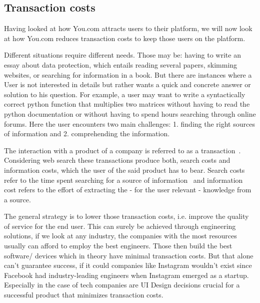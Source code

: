 \documentclass[5p,twocolumn,final]{elsarticle}
\begin{document}
\subsection{Transaction costs}
Having looked at how You.com attracts users to their platform, we will now look at how You.com reduces transaction costs to keep those users on the platform.\par
Different situations require different needs. Those may be: having to write an essay about data protection, which entails reading several papers, skimming websites, or searching for information in a book. But there are instances where a User is not interested in details but rather wants a quick and concrete answer or solution to his question. For example, a user may want to write a syntactically correct python function that multiplies two matrices without having to read the python documentation or without having to spend hours searching through online forums. Here the user encounters two main challenges: 1. finding the right sources of information and 2. comprehending the information. \par
The interaction with a product of a company is referred to as a transaction~\cite{williamson1989}. Considering web search these transactions produce both, search costs and information costs, which the user of the said product has to bear.
Search costs refer to the time spent searching for a source of information~\cite[p.126]{shapiro1999} and information cost refers to the effort of extracting the - for the user relevant - knowledge from a source.\par
The general strategy is to lower those transaction costs, i.e. improve the quality of service for the end user. This can surely be achieved through engineering solutions, if we look at any industry, the companies with the most resources usually can afford to employ the best engineers. Those then build the best software/ devices which in theory have minimal transaction costs. But that alone can't guarantee success, if it could companies like Instagram wouldn't exist since Facebook had industry-leading engineers when Instagram emerged as a startup. Especially in the case of tech companies are UI Design decisions crucial for a successful product that minimizes transaction costs. \par
\end{document}
